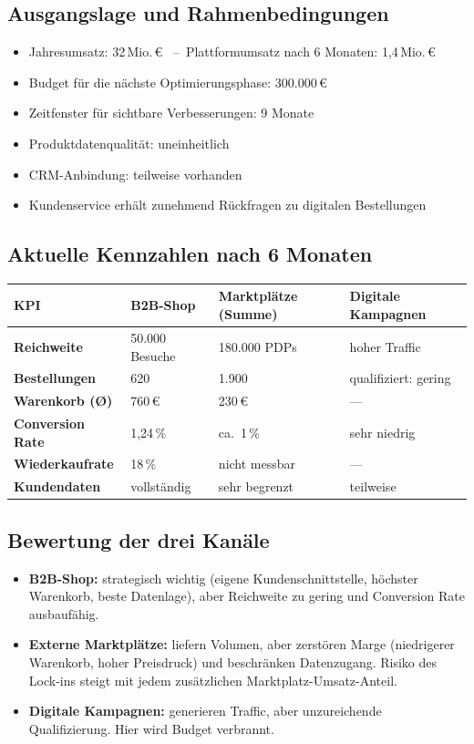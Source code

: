\documentclass[11pt,a4paper,oneside]{article}
\begin{document}
\subsection{Ausgangslage und Rahmenbedingungen}

\begin{itemize}
  \item Jahresumsatz: 32\,Mio.\,\euro{} \, --\, Plattform­umsatz nach 6 Monaten: 1{,}4\,Mio.\,\euro{}
  \item Budget für die nächste Optimierungsphase: 300{.}000\,\euro{}
  \item Zeitfenster für sichtbare Verbesserungen: 9 Monate
  \item Produktdatenqualität: uneinheitlich
  \item CRM-Anbindung: teilweise vorhanden
  \item Kundenservice erhält zunehmend Rückfragen zu digitalen Bestellungen
\end{itemize}

\subsection{Aktuelle Kennzahlen nach 6 Monaten}

\begin{tabularx}{\linewidth}{@{}>{\bfseries}lXXX@{}}
\toprule
KPI                & B2B-Shop      & Marktplätze (Summe) & Digitale Kampagnen \\
\midrule
Reichweite         & 50.000 Besuche & 180.000 PDPs        & hoher Traffic \\
Bestellungen       & 620            & 1.900               & qualifiziert: gering \\
Warenkorb (\O)     & 760\,\euro{}   & 230\,\euro{}        & --- \\
Conversion Rate    & 1{,}24\,\%     & ca.\ 1\,\%          & sehr niedrig \\
Wiederkaufrate     & 18\,\%         & nicht messbar       & --- \\
Kundendaten        & vollständig    & sehr begrenzt       & teilweise \\
\bottomrule
\end{tabularx}

\subsection{Bewertung der drei Kanäle}

\begin{itemize}
  \item \textbf{B2B-Shop:} strategisch wichtig (eigene Kundenschnittstelle, höchster Warenkorb, beste Datenlage), aber Reichweite zu gering und Conversion Rate ausbaufähig.
  \item \textbf{Externe Marktplätze:} liefern Volumen, aber zerstören Marge (niedrigerer Warenkorb, hoher Preisdruck) und beschränken Datenzugang. Risiko des Lock-ins steigt mit jedem zusätzlichen Marktplatz-Umsatz-Anteil.
  \item \textbf{Digitale Kampagnen:} generieren Traffic, aber unzureichende Qualifizierung. Hier wird Budget verbrannt.
\end{itemize}
\end{document}
